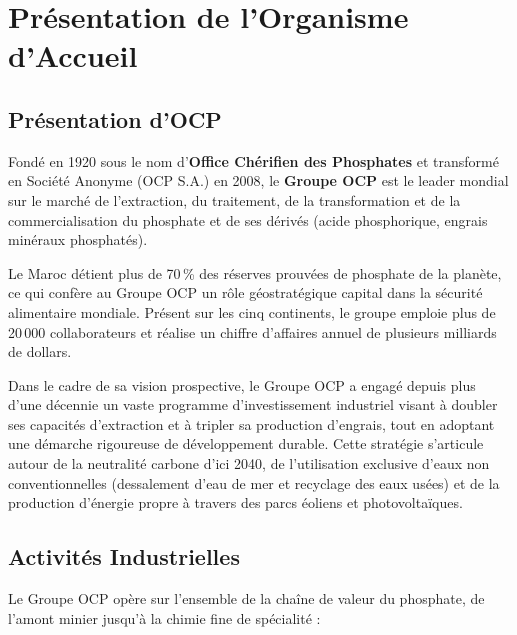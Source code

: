 ﻿\chapter{Présentation de l'Organisme d'Accueil}

\section{Présentation d'OCP}
Fondé en 1920 sous le nom d'\textbf{Office Chérifien des Phosphates} et transformé en Société Anonyme (OCP S.A.) en 2008, le \textbf{Groupe OCP} est le leader mondial sur le marché de l'extraction, du traitement, de la transformation et de la commercialisation du phosphate et de ses dérivés (acide phosphorique, engrais minéraux phosphatés).

Le Maroc détient plus de 70\,\% des réserves prouvées de phosphate de la planète, ce qui confère au Groupe OCP un rôle géostratégique capital dans la sécurité alimentaire mondiale. Présent sur les cinq continents, le groupe emploie plus de 20\,000 collaborateurs et réalise un chiffre d'affaires annuel de plusieurs milliards de dollars.

Dans le cadre de sa vision prospective, le Groupe OCP a engagé depuis plus d'une décennie un vaste programme d'investissement industriel visant à doubler ses capacités d'extraction et à tripler sa production d'engrais, tout en adoptant une démarche rigoureuse de développement durable. Cette stratégie s'articule autour de la neutralité carbone d'ici 2040, de l'utilisation exclusive d'eaux non conventionnelles (dessalement d'eau de mer et recyclage des eaux usées) et de la production d'énergie propre à travers des parcs éoliens et photovoltaïques.

\section{Activités Industrielles}
Le Groupe OCP opère sur l'ensemble de la chaîne de valeur du phosphate, de l'amont minier jusqu'à la chimie fine de spécialité :

